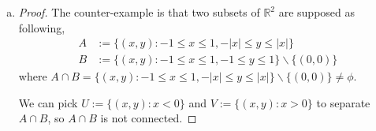 \begin{Exercise}
\begin{enumerate}[a)]
\begin{proof}
\begin{enumerate}
where $A\cap B = [b1, b2] \neq \phi$. Then $A\cup B = [a_1, a_2]$ is an interval, so is connected.

\item [$\mathbf{Case\ 3.}$]
$b_1 \leq a_1$ and $a_1 \leq b_2 < a_2$.

where $A\cap B = [a1, b2] \neq \phi$. Then $A\cup B = [b_1, a_2]$ is an interval, so is connected.

\item [$\mathbf{Case\ 4.}$]
$b_1 \leq a_1$ and $b_2 \geq a_2$.

where $A\cap B = [a1, a2] \neq \phi$. Then $A\cup B = [b_1, b_2]$ is an interval, so is connected.
\end{enumerate}
Hence, $A\cap B$ is always connected as promised.
\end{proof}

\item
\begin{proof}
The counter-example is that two subsets of $\mathbb{R}^2$ are supposed as following, 
\begin{align*}
A &:= \{(x,y) : -1\leq x \leq 1, -|x| \leq y \leq |x|\} \\
B &:=\{(x,y) : -1 \leq x \leq 1, -1 \leq y \leq 1\}\backslash\{(0,0)\}
\end{align*}
where $A\cap B = \{(x, y): -1 \leq x \leq 1, -|x| \leq y \leq |x|\} \backslash \{(0,0)\} \neq \phi.$

We can pick $U := \{(x,y):x<0\}$ and $V := \{(x,y):x>0\}$ to separate $A\cap B$, so $A\cap B$ is not connected.
\end{proof}

\end{enumerate}
\end{Exercise}